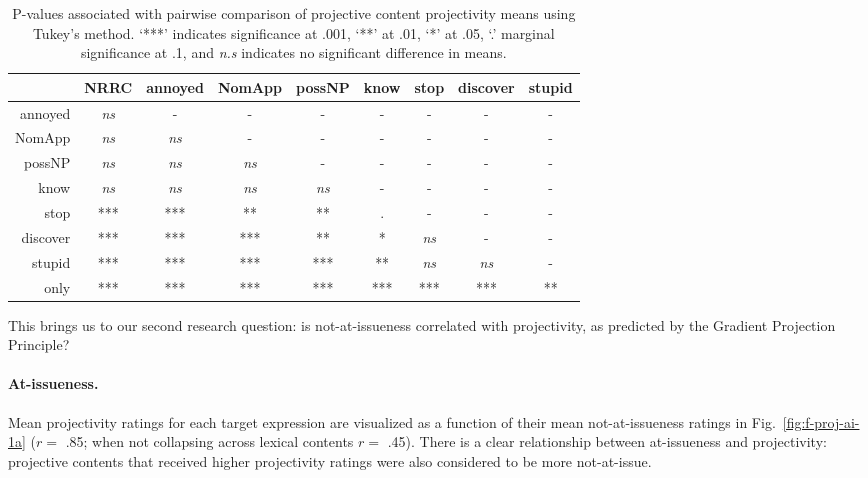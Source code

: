 \documentclass[11pt,fleqn]{article}
\newcommand{\6}{\mbox{$[\hspace*{-.6mm}[$}}
\newcommand{\9}{\mbox{$]\hspace*{-.6mm}]$}}
\newcommand{\figref}[1]{Fig.~\ref{#1}}
\begin{document}
\begin{table}[!h]
\begin{center}
\begin{tabular}{r c c c c c c c c}
\toprule
 &   NRRC & annoyed & NomApp &  possNP &  know & stop & discover & stupid \\
 \midrule
annoyed &  \emph{ns}  &  -  &        -   &       -  &        -  &   - &     -   &  -\\     
NomApp  &  \emph{ns} & \emph{ns} & -    &   -   &    -    &   -  &     -   & - \\    
possNP  &    \emph{ns} & \emph{ns} & \emph{ns} & - &      -  &     -     &  -   & - \\    
know     &   \emph{ns} & \emph{ns} & \emph{ns} & \emph{ns} & -   &    -   &    -       & -\\
stop     &   *** & *** & ** & ** & . & - &  - & -\\      
discover  &   *** & *** & *** & ** & * & \emph{ns} & - & -      \\
stupid    &  *** & *** & *** & *** & ** & \emph{ns} & \emph{ns} & - \\
only      &  *** & *** & *** & *** & *** & *** & *** & ** \\
\bottomrule
\end{tabular}
\caption{P-values associated with pairwise comparison of projective content projectivity means using Tukey's method. `***' indicates significance at .001, `**' at .01, `*' at .05, `.' marginal significance at .1, and \emph{n.s} indicates no significant difference in means.}\label{tab:pairwise}
\end{center}
\end{table}

This brings us to our second research question: is not-at-issueness correlated with projectivity, as predicted by the Gradient Projection Principle?

\paragraph{At-issueness.} Mean projectivity ratings for each target expression are visualized as a function of their mean not-at-issueness ratings in \figref{fig:f-proj-ai-1a} ($r =$ .85; when not collapsing across lexical contents $r =$ .45). There is a clear relationship between at-issueness and projectivity: projective contents that received higher projectivity ratings were also considered to be more not-at-issue.
\end{document}
